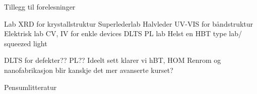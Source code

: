 \documentclass[%
oneside,                 %
final,                   %
10pt]{article}
\begin{document}
Tillegg til forelesninger 

Lab 
XRD for krystallstruktur 
Superlederlab 
Halvleder 
UV-VIS for båndstruktur 
Elektrisk lab 
CV, IV for enkle devices 
DLTS 
PL lab 
Helst en HBT type lab/ squeezed light  

DLTS for defekter?? 
PL?? 
Ideelt sett klarer vi hBT, HOM 
Renrom og nanofabrikasjon blir kanskje det mer avanserte kurset? 

Pensumlitteratur 



\end{document}
